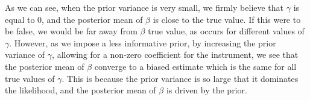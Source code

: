 As we can see, when the prior variance is very small, we firmly believe that $\gamma$ is equal to 0, and the posterior mean of $\beta$ is close to the true value. If this were to be false, we would be far away from $\beta$ true value, as occurs for different values of $\gamma$. However, as we impose a less informative prior, by increasing the prior variance of $\gamma$, allowing for a non-zero coefficient for the instrument, we see that the posterior mean of $\beta$ converge to a biased estimate which is the same for all true values of $\gamma$. This is because the prior variance is so large that it dominates the likelihood, and the posterior mean of $\beta$ is driven by the prior.